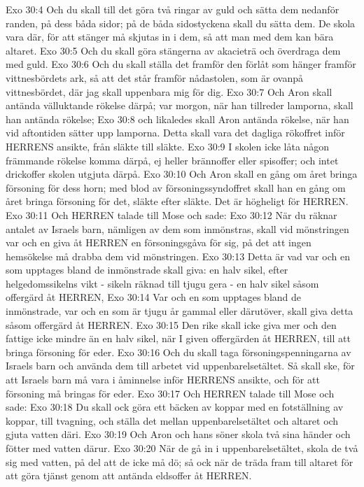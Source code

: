 Exo 30:4  Och du skall till det göra två ringar av guld och sätta dem nedanför randen, på dess båda sidor; på de båda sidostyckena skall du sätta dem. De skola vara där, för att stänger må skjutas in i dem, så att man med dem kan bära altaret.
Exo 30:5  Och du skall göra stängerna av akacieträ och överdraga dem med guld.
Exo 30:6  Och du skall ställa det framför den förlåt som hänger framför vittnesbördets ark, så att det står framför nådastolen, som är ovanpå vittnesbördet, där jag skall uppenbara mig för dig.
Exo 30:7  Och Aron skall antända välluktande rökelse därpå; var morgon, när han tillreder lamporna, skall han antända rökelse;
Exo 30:8  och likaledes skall Aron antända rökelse, när han vid aftontiden sätter upp lamporna. Detta skall vara det dagliga rökoffret inför HERRENS ansikte, från släkte till släkte.
Exo 30:9  I skolen icke låta någon främmande rökelse komma därpå, ej heller brännoffer eller spisoffer; och intet drickoffer skolen utgjuta därpå.
Exo 30:10  Och Aron skall en gång om året bringa försoning för dess horn; med blod av försoningssyndoffret skall han en gång om året bringa försoning för det, släkte efter släkte. Det är högheligt för HERREN.
Exo 30:11  Och HERREN talade till Mose och sade:
Exo 30:12  När du räknar antalet av Israels barn, nämligen av dem som inmönstras, skall vid mönstringen var och en giva åt HERREN en försoningsgåva för sig, på det att ingen hemsökelse må drabba dem vid mönstringen.
Exo 30:13  Detta är vad var och en som upptages bland de inmönstrade skall giva: en halv sikel, efter helgedomssikelns vikt - sikeln räknad till tjugu gera - en halv sikel såsom offergärd åt HERREN,
Exo 30:14  Var och en som upptages bland de inmönstrade, var och en som är tjugu år gammal eller därutöver, skall giva detta såsom offergärd åt HERREN.
Exo 30:15  Den rike skall icke giva mer och den fattige icke mindre än en halv sikel, när I given offergärden åt HERREN, till att bringa försoning för eder.
Exo 30:16  Och du skall taga försoningspenningarna av Israels barn och använda dem till arbetet vid uppenbarelsetältet. Så skall ske, för att Israels barn må vara i åminnelse inför HERRENS ansikte, och för att försoning må bringas för eder.
Exo 30:17  Och HERREN talade till Mose och sade:
Exo 30:18  Du skall ock göra ett bäcken av koppar med en fotställning av koppar, till tvagning, och ställa det mellan uppenbarelsetältet och altaret och gjuta vatten däri.
Exo 30:19  Och Aron och hans söner skola två sina händer och fötter med vatten därur.
Exo 30:20  När de gå in i uppenbarelsetältet, skola de två sig med vatten, på del att de icke må dö; så ock när de träda fram till altaret för att göra tjänst genom att antända eldsoffer åt HERREN.
